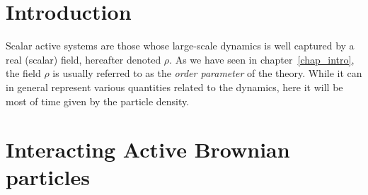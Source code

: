 \section{Introduction}

Scalar active systems are those whose large-scale dynamics is well captured by a real (scalar) field, hereafter denoted $\rho$. 
As we have seen in chapter~\ref{chap_intro}, the field $\rho$ is usually referred to as the \emph{order parameter} of the theory.
While it can in general represent various quantities related to the dynamics, here it will be most of time given by the particle density.





\section{Interacting Active Brownian particles}

